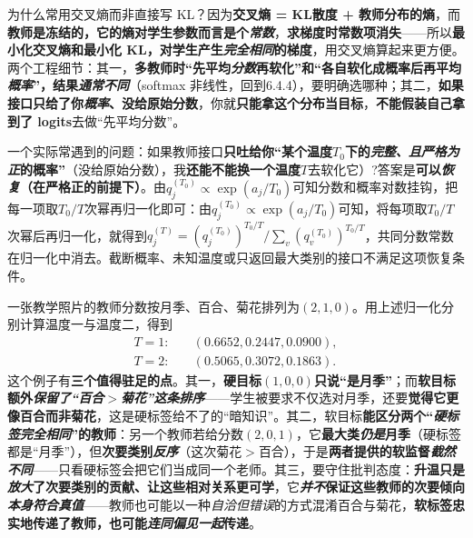 为什么常用交叉熵而非直接写 KL？因为\textbf{交叉熵 = KL散度 + 教师分布的熵}，而\textbf{教师是冻结的，它的熵对学生参数而言是个\emph{常数}}，\textbf{求梯度时常数项消失}——所以\textbf{最小化交叉熵和最小化 KL，对学生产生\emph{完全相同}的梯度}，用交叉熵算起来更方便。两个工程细节：其一，\textbf{多教师时“先平均\emph{分数}再软化”和“各自软化成概率后再平均\emph{概率}”，结果\emph{通常不同}}（softmax 非线性，回到6.4.4），要明确选哪种；其二，\textbf{如果接口只给了你\emph{概率}、没给原始分数}，你就\textbf{只能拿这个分布当目标}，\textbf{不能假装自己拿到了 logits}去做“先平均分数”。

一个实际常遇到的问题：如果教师接口\textbf{只吐给你“某个温度$T_0$下的\emph{完整、且严格为正}的概率”}（没给原始分数），我\textbf{还能不能换一个温度}$T$去软化它）?答案是\textbf{可以\emph{恢复}（在严格正的前提下）}。由$q_j^{(T_0)}\propto\exp(a_j/T_0)$可知分数和概率对数挂钩，把每一项取$T_0/T$次幂再归一化即可：由$q_j^{(T_0)}\propto\exp(a_j/T_0)$可知，将每项取$T_0/T$次幂后再归一化，就得到$q_j^{(T)}=(q_j^{(T_0)})^{T_0/T}/\sum_v(q_v^{(T_0)})^{T_0/T}$，共同分数常数在归一化中消去。截断概率、未知温度或只返回最大类别的接口不满足这项恢复条件。

\begin{example}[三个类别携带的信息]
  \label{ex:ket-integration-soft-labels}
  一张教学照片的教师分数按月季、百合、菊花排列为$(2,1,0)$。用上述归一化分别计算温度一与温度二，得到
  \[
    \begin{aligned}
      T=1:\quad &(0.6652,0.2447,0.0900),\\
      T=2:\quad &(0.5065,0.3072,0.1863).
    \end{aligned}
  \]
  这个例子有\textbf{三个值得驻足的点}。其一，\textbf{硬目标}$(1,0,0)$\textbf{只说“是月季”}；而\textbf{软目标额外\emph{保留了“百合$>$菊花”这条排序}}——学生被要求不仅选对月季，还要\textbf{觉得它更像百合而非菊花}，这是硬标签给不了的“暗知识”。其二，软目标\textbf{能区分两个“\emph{硬标签完全相同}”的教师}：另一个教师若给分数$(2,0,1)$，它\textbf{最大类\emph{仍是}月季}（硬标签都是“月季”），但\textbf{次要类别\emph{反序}}（这次菊花$>$百合），于是\textbf{两者提供的软监督\emph{截然不同}}——只看硬标签会把它们当成同一个老师。其三，要守住批判态度：\textbf{升温只是\emph{放大}了次要类别的贡献、让这些相对关系更可学}，它\textbf{\emph{并不}保证这些教师的次要倾向\emph{本身符合真值}}——教师也可能以一种\emph{自洽但错误}的方式混淆百合与菊花，\textbf{软标签忠实地传递了教师，也可能\emph{连同偏见一起}传递}。
\end{example}

